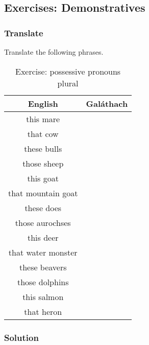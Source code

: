 \newpage
\subsection{Exercises: Demonstratives}

\subsubsection{Translate}

Translate the following phrases.
\begin{table}[H]
\centering
\begin{tabular}{|c|M{5.0cm}|}
  \toprule
  \textbf{English} & \textbf{Gal\'{a}thach}\\
  \toprule
  this mare & \\
  \midrule
  that cow & \\
  \midrule
  these bulls & \\
  \midrule
  those sheep & \\
  \midrule
  this goat & \\
  \midrule
  that mountain goat & \\
  \midrule
  these does & \\
  \midrule
  those aurochses & \\
  \midrule
  this deer & \\
  \midrule
  that water monster & \\
  \midrule
  these beavers & \\
  \midrule
  those dolphins & \\
  \midrule
  this salmon & \\
  \midrule
  that heron & \\
  \bottomrule
\end{tabular}
\label{exercise_possessive_pronouns_plural}
\caption{Exercise: possessive pronouns plural}
\end{table}

\newpage
\subsubsection{Solution}

